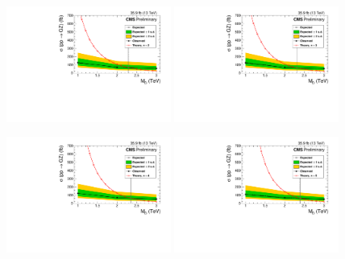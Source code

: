 \begin{figure}[hbtp]
  \centering
    \includegraphics[width=0.48\textwidth]{figures/ADD/add_limit_nd2.pdf}
    \includegraphics[width=0.48\textwidth]{figures/ADD/add_limit_nd3.pdf}

    \includegraphics[width=0.48\textwidth]{figures/ADD/add_limit_nd4.pdf}
    \includegraphics[width=0.48\textwidth]{figures/ADD/add_limit_nd5.pdf}


\end{figure}
